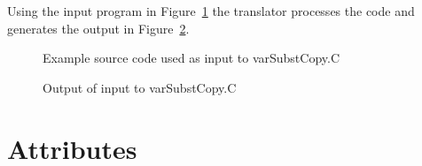 Using the input program in Figure~\ref{Tutorial:exampleInputCode_varSubstCopy}
the translator processes the code and generates the output in 
Figure~\ref{Tutorial:exampleOutput_varSubstCopy}.

\begin{figure}[!h]
{\indent
{\mySmallFontSize

\begin{latexonly}
   
\end{latexonly}

\begin{htmlonly}
   
\end{htmlonly}

}
}
\caption{Example source code used as input to varSubstCopy.C}
\label{Tutorial:exampleInputCode_varSubstCopy}
\end{figure}

\begin{figure}[!h]
{\indent
{\mySmallFontSize

\begin{latexonly}
   
\end{latexonly}

\begin{htmlonly}
   
\end{htmlonly}

}
}
\caption{Output of input to varSubstCopy.C}
\label{Tutorial:exampleOutput_varSubstCopy}
\end{figure}


\section{Attributes}

